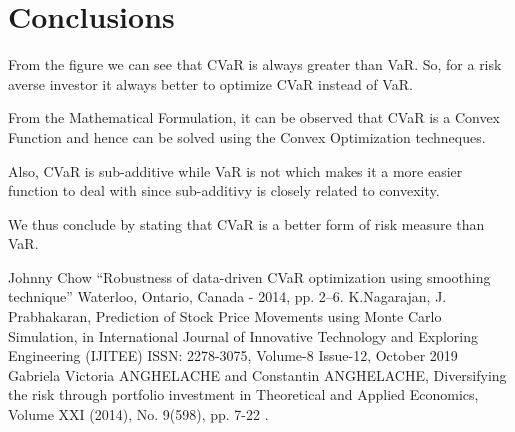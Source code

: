 \documentclass[conference]{IEEEtran}
\begin{document}
\section{Conclusions}

From the figure we can see that CVaR is always greater than VaR. So, for a risk averse investor it always better to optimize CVaR instead of VaR.

From the Mathematical Formulation, it can be observed that CVaR is a Convex Function and hence can be solved using the Convex Optimization techneques.

Also, CVaR is sub-additive while VaR is not which makes it a more easier function to deal with since sub-additivy is closely related to convexity. 

We thus conclude by stating that CVaR is a better form of risk measure than VaR. 





\begin{thebibliography}{00}
     Johnny Chow ``Robustness of data-driven CVaR optimization using smoothing technique'' Waterloo, Ontario, Canada - 2014, pp. 2--6.
     K.Nagarajan, J. Prabhakaran, Prediction of Stock Price Movements using Monte Carlo Simulation, in International Journal of Innovative Technology and Exploring Engineering (IJITEE) ISSN: 2278-3075, Volume-8 Issue-12, October 2019
     Gabriela Victoria ANGHELACHE and Constantin ANGHELACHE, Diversifying the risk through portfolio investment in Theoretical and Applied Economics, Volume XXI (2014), No. 9(598), pp. 7-22 .
\end{thebibliography}
\vspace{12pt}
\end{document}
